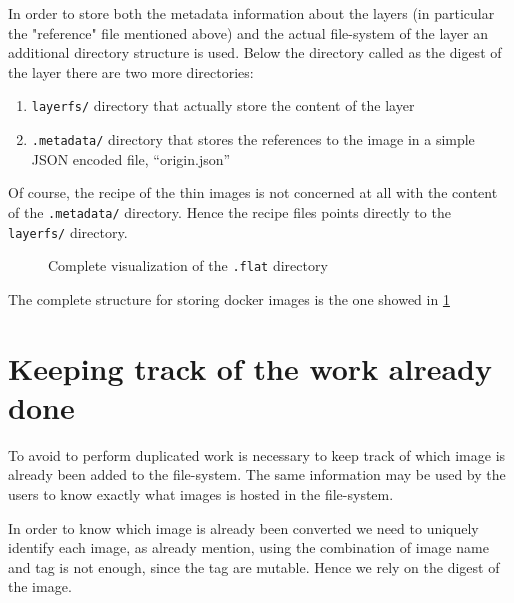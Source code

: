 In order to store both the metadata information about the layers (in particular
the "reference" file mentioned above) and the actual file-system of the layer
an additional directory structure is used. Below the directory called as the
digest of the layer there are two more directories: 
\begin{enumerate} 
        \item \texttt{layerfs/} directory that actually store the content of the layer
        \item \texttt{.metadata/} directory that stores the references to the image in a simple JSON encoded file, “origin.json”
\end{enumerate}

Of course, the recipe of the thin images is not concerned at all with the
content of the \texttt{.metadata/} directory.  Hence the recipe files points
directly to the \texttt{layerfs/} directory.

\begin{figure}
\caption{Complete visualization of the \texttt{.flat} directory}
\label{fig:docker-layer-structure}
\end{figure}

The complete structure for storing docker images is the one showed in
\ref{fig:docker-layer-structure}

\section{Keeping track of the work already done}
\label{sec:methodology-keep-track}

To avoid to perform duplicated work is necessary to keep track of which image
is already been added to the file-system. The same information may be used by
the users to know exactly what images is hosted in the file-system.

In order to know which image is already been converted we need to uniquely
identify each image, as already mention, using the combination of image name
and tag is not enough, since the tag are mutable.  Hence we rely on the digest
of the image.


